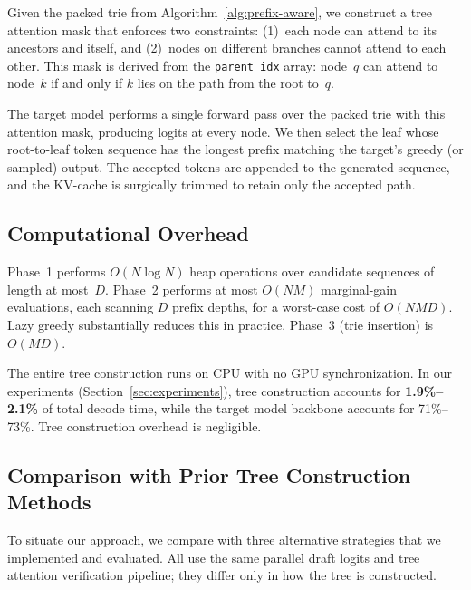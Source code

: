 Given the packed trie from Algorithm~\ref{alg:prefix-aware}, we
construct a tree attention mask that enforces two constraints:
(1)~each node can attend to its ancestors and itself, and
(2)~nodes on different branches cannot attend to each other.  This mask
is derived from the \texttt{parent\_idx} array: node~$q$ can attend to
node~$k$ if and only if $k$ lies on the path from the root to~$q$.

The target model performs a single forward pass over the packed trie
with this attention mask, producing logits at every node.  We then
select the leaf whose root-to-leaf token sequence has the longest
prefix matching the target's greedy (or sampled) output.  The
accepted tokens are appended to the generated sequence, and the
KV-cache is surgically trimmed to retain only the accepted path.

\subsection{Computational Overhead}
\label{sec:overhead}

Phase~1 performs $O(N \log N)$ heap operations over candidate sequences
of length at most~$D$.  Phase~2 performs at most $O(NM)$ marginal-gain
evaluations, each scanning $D$ prefix depths, for a worst-case cost of
$O(NMD)$.  Lazy greedy substantially reduces this in practice.  Phase~3
(trie insertion) is $O(MD)$.

The entire tree construction runs on CPU with no GPU synchronization.
In our experiments (Section~\ref{sec:experiments}), tree construction
accounts for \textbf{1.9\%--2.1\%} of total decode time, while the
target model backbone accounts for 71\%--73\%.  Tree construction
overhead is negligible.

\subsection{Comparison with Prior Tree Construction Methods}
\label{sec:comparison}

To situate our approach, we compare with three alternative strategies
that we implemented and evaluated.  All use the same parallel draft
logits and tree attention verification pipeline; they differ only in
how the tree is constructed.

